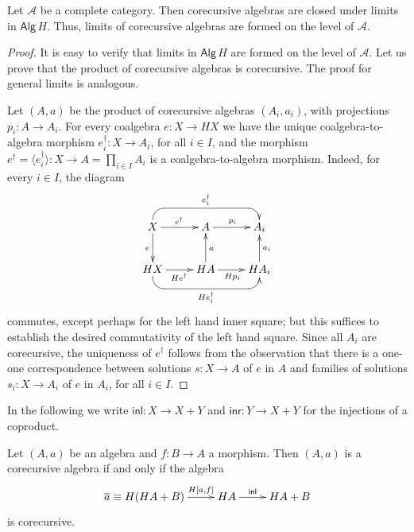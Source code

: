 \documentclass{LMCS}
\theoremstyle{plain}
\theoremstyle{definition}
\numberwithin{equation}{section}
\begin{document}
\begin{prop}\label{lim of core is core}
Let $\mathcal A$ be a complete category. Then corecursive algebras are closed under limits in $\mathsf{Alg}\, H$. Thus, limits of corecursive algebras are formed on the level of $\mathcal A$.
\end{prop}

\begin{proof}
It is easy to verify that limits in $\mathsf{Alg}\, H$ are formed on the level of $\mathcal A$. Let us prove that the product of corecursive algebras is  corecursive. The proof for general limits is analogous.

Let $(A,a)$ be  the product of corecursive algebras $(A_i,a_i)$, with projections $p_i:A\rightarrow A_i$. For every coalgebra $e:X\rightarrow HX$ we have the unique coalgebra-to-algebra morphism $e^\dagger _i:X\rightarrow A_i$, for all $i\in I$, and the morphism $e^\dagger =\langle e_i^\dagger\rangle :X\rightarrow A=\prod_{i\in I}A_i$ is a coalgebra-to-algebra morphism. Indeed, for every $i\in I$, the diagram
$$
\xymatrix{
X\ar[r]^{e^\dagger}\ar[d]_{e}&A\ar[r]^{p_i}&A_i\ar@{<-}`u[l]`[ll]_{e^\dagger_i}[ll]\\
HX\ar[r]_{He^\dagger}&HA\ar[u]_a\ar[r]_{Hp_i}&HA_i\ar[u]_{a_i}\ar@{<-}`d[l]`[ll]^{He^\dagger_i}[ll]
}
$$
commutes, except perhaps for the left hand inner square; but this
suffices to establish the desired commutativity of the left hand
square.  Since all $A_i$ are corecursive, the uniqueness of
$e^\dagger$ follows from the observation that there is a one-one
correspondence between solutions $s:X\rightarrow A$ of $e$ in $A$ and
families of solutions $s_i:X\rightarrow A_i$ of $e$ in $A_i$, for all
$i\in I$.
\end{proof}

In the following we write $\mathsf{inl}:X\rightarrow X+Y$ and $\mathsf{inr}:Y\rightarrow X+Y$ for the injections of a coproduct.

\begin{lem}\label{generalized}
Let $(A,a)$ be an algebra and $f:B\rightarrow A$  a morphism. Then $(A,a)$ is a corecursive algebra if and only if the algebra
$$\xymatrix{\overline a\equiv H(HA+B)\ar[r]^-{H[a,f]}& HA\ar[r]^-{\mathsf{inl}}& HA+B}$$
is corecursive.
\end{lem}
\end{document}
